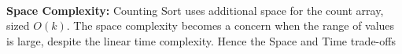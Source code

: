 \documentclass[preview]{standalone}
\begin{document}
\begin{center}
\quad\\ \textbf{Space Complexity:} Counting Sort uses additional space for the count array, sized $O(k)$. The space complexity becomes a concern when the range of values is large, despite the linear time complexity. Hence the Space and Time trade-offs
\end{center}
\end{document}
